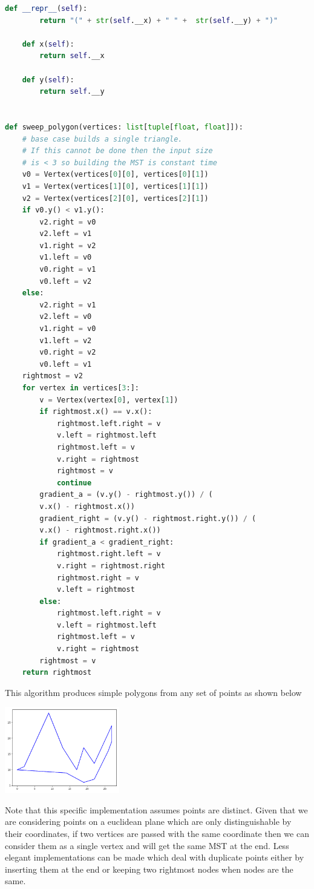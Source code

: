 \documentclass[10pt,\jkfside,a4paper]{article}
\begin{document}
\begin{enumerate}
\begin{enumerate}
\begin{lstlisting}[language=python]
    def __repr__(self):
        return "(" + str(self.__x) + " " +  str(self.__y) + ")"

    def x(self):
        return self.__x

    def y(self):
        return self.__y


def sweep_polygon(vertices: list[tuple[float, float]]):
    # base case builds a single triangle.
    # If this cannot be done then the input size
    # is < 3 so building the MST is constant time
    v0 = Vertex(vertices[0][0], vertices[0][1])
    v1 = Vertex(vertices[1][0], vertices[1][1])
    v2 = Vertex(vertices[2][0], vertices[2][1])
    if v0.y() < v1.y():
        v2.right = v0
        v2.left = v1
        v1.right = v2
        v1.left = v0
        v0.right = v1
        v0.left = v2
    else:
        v2.right = v1
        v2.left = v0
        v1.right = v0
        v1.left = v2
        v0.right = v2
        v0.left = v1
    rightmost = v2
    for vertex in vertices[3:]:
        v = Vertex(vertex[0], vertex[1])
        if rightmost.x() == v.x():
            rightmost.left.right = v
            v.left = rightmost.left
            rightmost.left = v
            v.right = rightmost
            rightmost = v
            continue
        gradient_a = (v.y() - rightmost.y()) / (
		v.x() - rightmost.x())
        gradient_right = (v.y() - rightmost.right.y()) / (
		v.x() - rightmost.right.x())
        if gradient_a < gradient_right:
            rightmost.right.left = v
            v.right = rightmost.right
            rightmost.right = v
            v.left = rightmost
        else:
            rightmost.left.right = v
            v.left = rightmost.left
            rightmost.left = v
            v.right = rightmost
        rightmost = v
    return rightmost
\end{lstlisting}

This algorithm produces simple polygons from any set of points as shown below
\begin{center}
\includegraphics[width=5cm]{polygon}
\end{center}

Note that this specific implementation assumes points are distinct. Given that we are considering points on a 
euclidean plane which are only distinguishable by their coordinates, if two vertices are passed with the same 
coordinate then we can consider them as a single vertex and will get the same MST at the end. Less elegant 
implementations can be made which deal with duplicate points either by inserting them at the end or keeping two 
rightmost nodes when nodes are the same.


\end{enumerate}
\end{enumerate}
\end{document}
